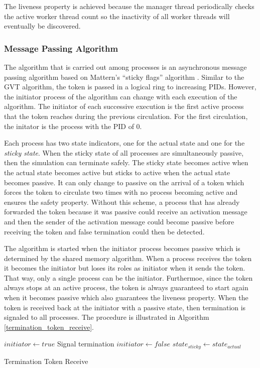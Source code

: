 \documentclass[11pt]{book}
\begin{document}
The liveness property is achieved because the manager thread periodically checks the active
worker thread count so the inactivity of all worker threads will eventually be discovered.

\subsubsection{Message Passing Algorithm}

The algorithm that is carried out among processes is an asynchronous message passing algorithm based
on Mattern's ``sticky flags'' algorithm \cite{mattern-91}.  Similar to the GVT algorithm, the token
is passed in a logical ring to increasing PIDs.  However, the initiator process of the algorithm can
change with each execution of the algorithm.  The initiator of each successive execution is the
first active process that the token reaches during the previous circulation.  For the first
circulation, the initator is the process with the PID of 0.

Each process has two state indicators, one for the actual state and one for the \emph{sticky state}.
When the sticky state of all processes are simultaneously passive, then the simulation can terminate
safely.  The sticky state becomes active when the actual state becomes active but sticks to active
when the actual state becomes passive.  It can only change to passive on the arrival of a token
which forces the token to circulate two times with no process becoming active and ensures the safety
property.  Without this scheme, a process that has already forwarded the token because it was
passive could receive an activation message and then the sender of the activation message could
become passive before receiving the token and false termination could then be detected.

The algorithm is started when the initiator process becomes passive which is determined by the
shared memory algorithm.  When a process receives the token it becomes the initiator but loses its
roles as initiator when it sends the token.  That way, only a single process can be the initiator.
Furthermoe, since the token always stops at an active process, the token is always guaranteed to
start again when it becomes passive which also guarantees the liveness property.  When the token is
received back at the initiator with a passive state, then termination is signaled to all processes.
The procedure is illustrated in Algorithm \ref{termination_token_receive}.

\begin{algorithm}
\DontPrintSemicolon
{}
    $initiator \gets true$\;
     {
         {
            Signal termination\;
        }
    }  {
        $initiator \gets false$\;
        \;
    }
    $state_{sticky} \gets state_{actual}$\;
\caption{Termination Token Receive}\label{termination_token_receive}
\end{algorithm}
\end{document}
